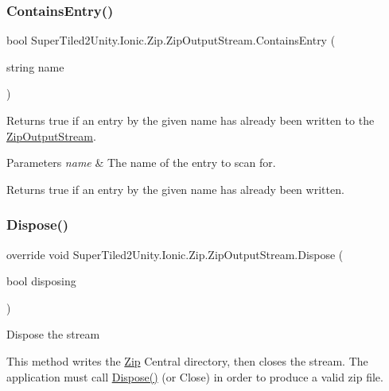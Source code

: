 \subsubsection{\texorpdfstring{Contains\+Entry()}{ContainsEntry()}}
{\footnotesize\ttfamily bool Super\+Tiled2\+Unity.\+Ionic.\+Zip.\+Zip\+Output\+Stream.\+Contains\+Entry (\begin{DoxyParamCaption}\item[{string}]{name }\end{DoxyParamCaption})}



Returns true if an entry by the given name has already been written to the \mbox{\hyperlink{class_super_tiled2_unity_1_1_ionic_1_1_zip_1_1_zip_output_stream}{Zip\+Output\+Stream}}. 


\begin{DoxyParams}{Parameters}
{\em name} & The name of the entry to scan for. \\
\hline
\end{DoxyParams}


\begin{DoxyReturn}{Returns}
true if an entry by the given name has already been written. 
\end{DoxyReturn}
\mbox{\label{class_super_tiled2_unity_1_1_ionic_1_1_zip_1_1_zip_output_stream_ac792f46e1b4cde3da0aa1eaf4ad28db4}} 
\subsubsection{\texorpdfstring{Dispose()}{Dispose()}}
{\footnotesize\ttfamily override void Super\+Tiled2\+Unity.\+Ionic.\+Zip.\+Zip\+Output\+Stream.\+Dispose (\begin{DoxyParamCaption}\item[{bool}]{disposing }\end{DoxyParamCaption})\hspace{0.3cm}{\ttfamily [protected]}}



Dispose the stream 

This method writes the \mbox{\hyperlink{namespace_super_tiled2_unity_1_1_ionic_1_1_zip}{Zip}} Central directory, then closes the stream. The application must call \mbox{\hyperlink{class_super_tiled2_unity_1_1_ionic_1_1_zip_1_1_zip_output_stream_ac792f46e1b4cde3da0aa1eaf4ad28db4}{Dispose()}} (or Close) in order to produce a valid zip file. 

